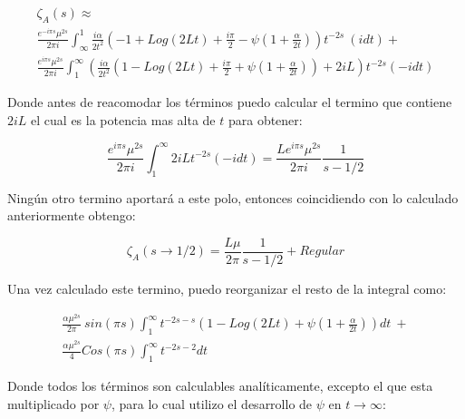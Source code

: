 \begin{equation}
\begin{array}{c}
    \zeta _A (s) \approx \\
     \frac{e^{-i \pi s} \mu ^{2s}}{2 \pi i} \int _{\infty} ^{1}
     \frac{ i \alpha}{2 t^2}
     \left(
     - 1 + Log(2 L t) + \frac{i \pi}{2}  - \psi (1+\frac{\alpha}{2 t})
     \right)
     t^{-2 s}
      \ 
     (i dt) + \\
     \frac{e^{i \pi s} \mu ^{2s}}{2 \pi i} \int _1 ^{\infty}
	\left(      
     \frac{ i \alpha}{2  t^2}
     \left(
     1 - Log(2 L t) + \frac{i \pi}{2} + \psi (1 + \frac{\alpha}{2 t}) 
      
     \right)
     + 2 i L
     \right)
     t^{-2 s}
     (-i dt)
     
\end{array}
\end{equation}

Donde antes de reacomodar los términos puedo calcular el termino que contiene $2iL$ el cual es la potencia mas alta de $t$ para obtener: 

\begin{equation}
    \frac{e^{i \pi s} \mu ^{2s} }{2 \pi i }
    \int _1 ^{\infty}
    2 i L    
    t ^{-2 s}
    (-i dt) =  
    \frac{L e^{i \pi s} \mu ^{2s}}{2 \pi i} \frac{1}{s-1/2   }
\end{equation}

Ningún otro termino aportará a este polo, entonces coincidiendo con lo calculado anteriormente obtengo:

\begin{equation}
    \zeta _A  (s \rightarrow 1/2) = \frac{L \mu }{2 \pi} \frac{1}{s- 1/2 } + Regular
\end{equation}


Una vez calculado este termino, puedo reorganizar el resto de la integral como:

\begin{equation}
\begin{array}{c}
    \frac{\alpha \mu ^{2s} }{2 \pi} \ sin(\pi s)
    \int _1 ^{\infty}
    t ^{-2 s-s} 
    \left(
    1 - Log(2Lt) + \psi (1 + \frac{\alpha}{2t})
    \right) dt \ + \\ 
    \frac{\alpha \mu ^{2s} }{4} 
    Cos(\pi s)
    \int _1 ^{\infty} t^{-2s-2} dt
\end{array}
\end{equation}

Donde todos los términos son calculables analíticamente, excepto el que esta multiplicado por $\psi$, para lo cual utilizo el desarrollo de $\psi$ en $t \rightarrow \infty$:

